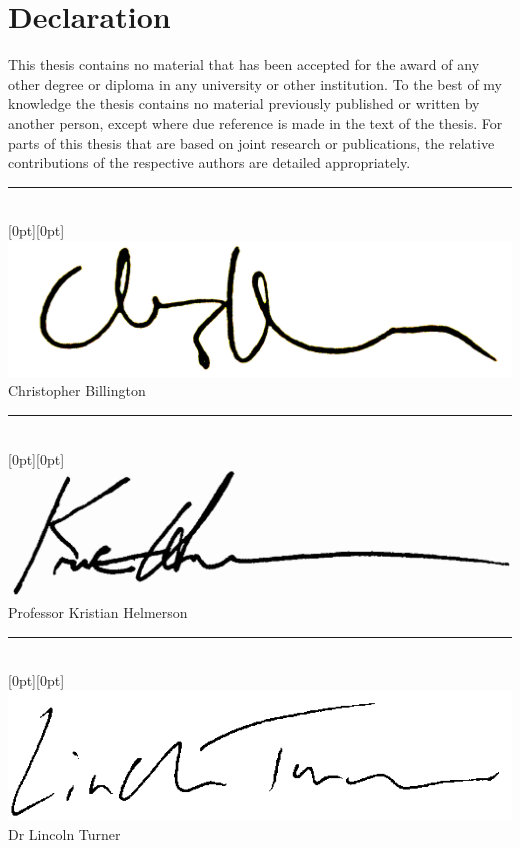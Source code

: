 \chapter*{Declaration}

This thesis contains no material that has been accepted for the award of any other degree or diploma in any university or other institution. To the best of my knowledge the thesis contains no material previously published or written by another person, except where due reference is made in the text of the thesis. For parts of this thesis that are based on joint research or publications, the relative contributions of the respective authors are detailed appropriately.

\begin{center}
\vspace{1.5cm}
\rule{8cm}{1pt}\\
\raisebox{0.5cm}[0pt][0pt]{\includegraphics[scale=0.1]{submission/cjb}}\\
Christopher Billington

\vspace{1.5cm}
\rule{8cm}{1pt}\\
\raisebox{0.5cm}[0pt][0pt]{\includegraphics[scale=0.15]{submission/kh}}\\
Professor Kristian Helmerson  

\vspace{1.5cm}
\rule{8cm}{1pt}\\
\raisebox{0.6cm}[0pt][0pt]{\includegraphics[scale=0.9]{submission/ldt}}\\
Dr Lincoln Turner


\end{center}
